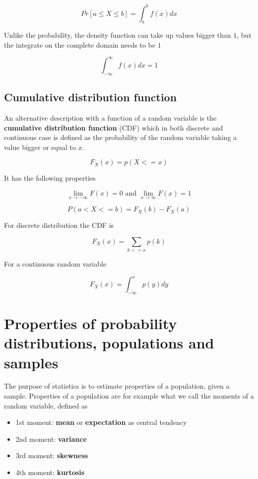 \[Pr[a \le X \le b] = \int_a^bf(x)dx\]

Unlike the probability, the density function can take up values bigger than \(1\), but the integrate on the complete domain needs to be \(1\)

\[\int_{-\infty}^\infty f(x)dx = 1\]

\subsection{Cumulative distribution function}

An alternative description with a function of a random variable is the \textbf{cumulative distribution function} (CDF) which in both discrete and continuous case is defined as the probability of the random variable taking a value bigger or equal to \(x\).

\[F_X(x) = p(X <= x)\]

It has the following properties

\[\lim_{x \to - \infty} F(x) = 0\text{ and }\lim_{x \to  \infty} F(x) = 1\]

\[P(a < X <= b) = F_X(b) - F_X(a)\]

For discrete distribution the CDF is

\[F_X(x) = \sum_{k <= x} p(k)\]

For a continuous random variable

\[F_X(x) = \int_{-\infty}^x p(y)dy\]

\section{Properties of probability distributions, populations and samples}

The purpose of statistics is to estimate properties of a population, given a sample. Properties of a population are for example what we call the moments of a random variable, defined as

\begin{itemize}
    \item 1st moment: \textbf{mean} or \textbf{expectation} as central tendency
    \item 2nd moment: \textbf{variance}
    \item 3rd moment: \textbf{skewness}
    \item 4th moment: \textbf{kurtosis}
\end{itemize}

